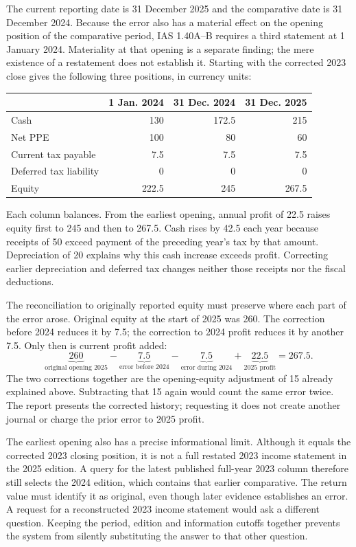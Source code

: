 The current reporting date is 31 December 2025 and the comparative date is
31 December 2024. Because the error also has a material effect on the opening
position of the comparative period, IAS 1.40A--B requires a third statement
at 1 January 2024. Materiality at that opening is a separate finding; the
mere existence of a restatement does not establish it. Starting with the
corrected 2023 close gives the following three positions, in currency units:

\begin{center}
\small
\begin{tabular}{lrrr}
\toprule
& 1 Jan. 2024 & 31 Dec. 2024 & 31 Dec. 2025\\
\midrule
Cash & 130 & 172.5 & 215\\
Net PPE & 100 & 80 & 60\\
Current tax payable & 7.5 & 7.5 & 7.5\\
Deferred tax liability & 0 & 0 & 0\\
Equity & 222.5 & 245 & 267.5\\
\bottomrule
\end{tabular}
\end{center}

Each column balances. From the earliest opening, annual profit of 22.5
raises equity first to 245 and then to 267.5. Cash rises by 42.5 each
year because receipts of 50 exceed payment of the preceding year's tax
by that amount. Depreciation of 20 explains why this cash increase exceeds
profit. Correcting earlier depreciation and deferred tax changes neither
those receipts nor the fiscal deductions.

The reconciliation to originally reported equity must preserve where each
part of the error arose. Original equity at the start of 2025 was 260.
The correction before 2024 reduces it by 7.5; the correction to 2024
profit reduces it by another 7.5. Only then is current profit added:
\[
 \underbrace{260}_{\text{original opening 2025}}
 -\underbrace{7.5}_{\text{error before 2024}}
 -\underbrace{7.5}_{\text{error during 2024}}
 +\underbrace{22.5}_{\text{2025 profit}}
 =267.5.
\]
The two corrections together are the opening-equity adjustment of 15
already explained above. Subtracting that 15 again would count the same
error twice. The report presents the corrected history; requesting it
does not create another journal or charge the prior error to 2025 profit.

The earliest opening also has a precise informational limit. Although it
equals the corrected 2023 closing position, it is not a full restated 2023
income statement in the 2025 edition. A query for the latest published
full-year 2023 column therefore still selects the 2024 edition, which
contains that earlier comparative. The return value must identify it as
original, even though later evidence establishes an error. A request for
a reconstructed 2023 income statement would ask a different question.
Keeping the period, edition and information cutoffs together prevents the
system from silently substituting the answer to that other question.
